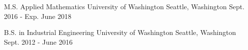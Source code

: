 

\begin{cventries}

  \cventry
    {M.S. Applied Mathematics} %
    {University of Washington} %
    {Seattle, Washington} %
    {Sept. 2016 - Exp. June 2018} %
	{}

  \cventry
    {B.S. in Industrial Engineering} %
    {University of Washington} %
    {Seattle, Washington} %
    {Sept. 2012 - June 2016} %
	{}


\end{cventries}
